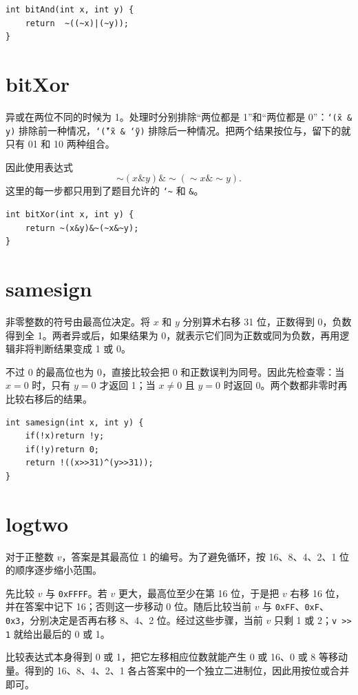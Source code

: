 \documentclass[12pt,a4paper]{ctexart}
\begin{document}
\begin{lstlisting}
int bitAnd(int x, int y) {
    return  ~((~x)|(~y));
}
\end{lstlisting}

\section{bitXor}
异或在两位不同的时候为 1。处理时分别排除“两位都是 1”和“两位都是 0”：\texttt{\char`\~(x \& y)} 排除前一种情况，\texttt{\char`\~(\char`\~x \& \char`\~y)} 排除后一种情况。把两个结果按位与，留下的就只有 01 和 10 两种组合。

因此使用表达式
\[
\sim(x\mathbin{\&}y)\mathbin{\&}\sim(\sim x\mathbin{\&}\sim y).
\]
这里的每一步都只用到了题目允许的 \texttt{\char`\~} 和 \texttt{\&}。

\begin{lstlisting}
int bitXor(int x, int y) {
    return ~(x&y)&~(~x&~y);
}
\end{lstlisting}

\section{samesign}
非零整数的符号由最高位决定。将 $x$ 和 $y$ 分别算术右移 31 位，正数得到 0，负数得到全 1。两者异或后，如果结果为 0，就表示它们同为正数或同为负数，再用逻辑非将判断结果变成 1 或 0。

不过 0 的最高位也为 0，直接比较会把 0 和正数误判为同号。因此先检查零：当 $x=0$ 时，只有 $y=0$ 才返回 1；当 $x\ne0$ 且 $y=0$ 时返回 0。两个数都非零时再比较右移后的结果。

\begin{lstlisting}
int samesign(int x, int y) {
    if(!x)return !y;
    if(!y)return 0;
    return !((x>>31)^(y>>31));
}
\end{lstlisting}

\section{logtwo}
对于正整数 $v$，答案是其最高位 1 的编号。为了避免循环，按 16、8、4、2、1 位的顺序逐步缩小范围。

先比较 $v$ 与 \texttt{0xFFFF}。若 $v$ 更大，最高位至少在第 16 位，于是把 $v$ 右移 16 位，并在答案中记下 16；否则这一步移动 0 位。随后比较当前 $v$ 与 \texttt{0xFF}、\texttt{0xF}、\texttt{0x3}，分别决定是否再右移 8、4、2 位。经过这些步骤，当前 $v$ 只剩 1 或 2；\texttt{v >> 1} 就给出最后的 0 或 1。

比较表达式本身得到 0 或 1，把它左移相应位数就能产生 0 或 16、0 或 8 等移动量。得到的 16、8、4、2、1 各占答案中的一个独立二进制位，因此用按位或合并即可。
\end{document}
